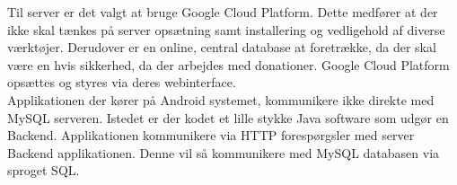 Til server er det valgt at bruge Google Cloud Platform. Dette medfører at der ikke skal tænkes på server opsætning samt installering og vedligehold af diverse værktøjer. Derudover er en online, central database at foretrække, da der skal være en hvis sikkerhed, da der arbejdes med donationer.
Google Cloud Platform opsættes og styres via deres webinterface.\\
Applikationen der kører på Android systemet, kommunikere ikke direkte med MySQL serveren. Istedet er der kodet et lille stykke Java software som udgør en Backend. Applikationen kommunikere via HTTP forespørgsler med server Backend applikationen. Denne vil så kommunikere med MySQL databasen via sproget SQL.